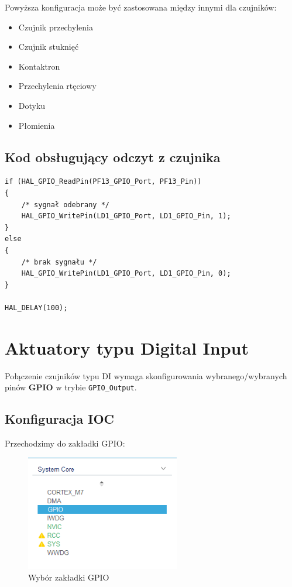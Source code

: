 \documentclass[11pt, a4paper]{article}
\begin{document}
Powyższa konfiguracja może być zastosowana między innymi dla czujników:

\begin{itemize}
    \item Czujnik przechylenia
    \item Czujnik stuknięć
    \item Kontaktron
    \item Przechylenia rtęciowy
    \item Dotyku
    \item Płomienia
\end{itemize}

\subsection* {Kod obsługujący odczyt z czujnika}
\begin{lstlisting}[style=lstC, caption={Kod pętli \texttt{while()}}]
if (HAL_GPIO_ReadPin(PF13_GPIO_Port, PF13_Pin))
{
    /* sygnał odebrany */
    HAL_GPIO_WritePin(LD1_GPIO_Port, LD1_GPIO_Pin, 1);
}
else
{
    /* brak sygnału */
    HAL_GPIO_WritePin(LD1_GPIO_Port, LD1_GPIO_Pin, 0);
}

HAL_DELAY(100);
\end{lstlisting}

\newpage





\section* {Aktuatory typu Digital Input}

Połączenie czujników typu DI wymaga skonfigurowania wybranego/wybranych pinów \textbf{GPIO} w trybie
\texttt{GPIO\_Output}.

\subsection*{Konfiguracja IOC}

Przechodzimy do zakładki GPIO:
\begin{figure}[h!]
    \centering
    \includegraphics[width=0.6\textwidth]{IMAGES/gpio.png}
    \caption{Wybór zakładki GPIO}
\end{figure}
\end{document}
